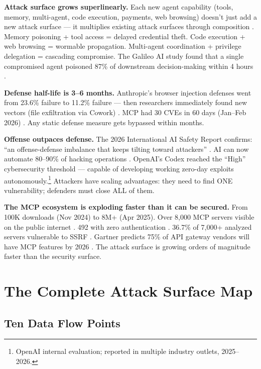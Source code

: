 \documentclass[11pt,letterpaper]{article}
\begin{document}
\textbf{Attack surface grows superlinearly.} Each new agent capability (tools, memory, multi-agent, code execution, payments, web browsing) doesn't just add a new attack surface --- it multiplies existing attack surfaces through composition \cite{kim2026,securitymodeling}. Memory poisoning + tool access = delayed credential theft. Code execution + web browsing = wormable propagation. Multi-agent coordination + privilege delegation = cascading compromise. The Galileo AI study found that a single compromised agent poisoned 87\% of downstream decision-making within 4 hours \cite{galileo}.

\textbf{Defense half-life is 3--6 months.} Anthropic's browser injection defenses went from 23.6\% failure to 11.2\% failure --- then researchers immediately found new vectors (file exfiltration via Cowork) \cite{anthropicrates}. MCP had 30 CVEs in 60 days (Jan--Feb 2026) \cite{checkmarx,cosai}. Any static defense measure gets bypassed within months.

\textbf{Offense outpaces defense.} The 2026 International AI Safety Report confirms: ``an offense-defense imbalance that keeps tilting toward attackers'' \cite{aisafety}. AI can now automate 80--90\% of hacking operations \cite{trendmicro}. OpenAI's Codex reached the ``High'' cybersecurity threshold --- capable of developing working zero-day exploits autonomously.\footnote{OpenAI internal evaluation; reported in multiple industry outlets, 2025--2026.} Attackers have scaling advantages: they need to find ONE vulnerability; defenders must close ALL of them.

\textbf{The MCP ecosystem is exploding faster than it can be secured.} From 100K downloads (Nov 2024) to 8M+ (Apr 2025). Over 8,000 MCP servers visible on the public internet \cite{checkmarx,paloalto}. 492 with zero authentication \cite{checkmarx}. 36.7\% of 7,000+ analyzed servers vulnerable to SSRF \cite{checkmarx}. Gartner predicts 75\% of API gateway vendors will have MCP features by 2026 \cite{gartner}. The attack surface is growing orders of magnitude faster than the security surface.


\section{The Complete Attack Surface Map}
\label{sec:attacksurface}

\subsection{Ten Data Flow Points}
\end{document}

